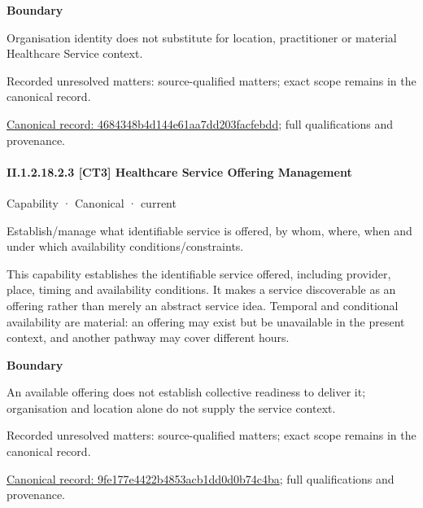 \textbf{Boundary}



Organisation identity does not substitute for location, practitioner or material Healthcare Service context.


{\small Recorded unresolved matters: source-qualified matters; exact scope remains in the canonical record.}\par
{\footnotesize \href{../../../../../../../continuum/strategy/capability/4684348b4d144e61aa7dd203facfebdd.md}{Canonical record: 4684348b4d144e61aa7dd203facfebdd}; full qualifications and provenance.}\par
\paragraph*{II.1.2.18.2.3 [CT3] Healthcare Service Offering Management}
\label{navigation:II.1.2.18.2.3}

\label{element:9fe177e4422b4853acb1dd0d0b74c4ba}
{\small Capability · Canonical · current}\par

Establish/manage what identifiable service is offered, by whom, where, when and under which availability conditions/constraints.



This capability establishes the identifiable service offered, including provider, place, timing and availability conditions. It makes a service discoverable as an offering rather than merely an abstract service idea. Temporal and conditional availability are material: an offering may exist but be unavailable in the present context, and another pathway may cover different hours.



\textbf{Boundary}



An available offering does not establish collective readiness to deliver it; organisation and location alone do not supply the service context.


{\small Recorded unresolved matters: source-qualified matters; exact scope remains in the canonical record.}\par
{\footnotesize \href{../../../../../../../continuum/strategy/capability/9fe177e4422b4853acb1dd0d0b74c4ba.md}{Canonical record: 9fe177e4422b4853acb1dd0d0b74c4ba}; full qualifications and provenance.}\par
